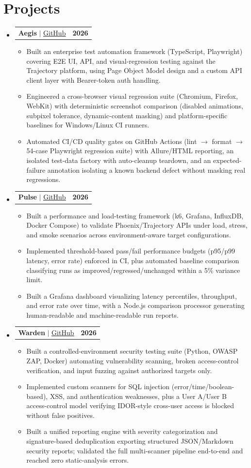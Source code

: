 \documentclass[letterpaper,10pt]{article}
\makeatletter
\newcommand{\resumeItem}[1]{
  \item\small{
    {#1 \vspace{-2pt}}
  }
}
\newcommand{\resumeProjectHeading}[2]{
    \item
    \begin{tabular*}{1.001\textwidth}{l@{\extracolsep{\fill}}r}
      \small#1 & \textbf{\small #2}\\
    \end{tabular*}\vspace{-7pt}
}
\newcommand{\resumeSubHeadingListStart}{\begin{itemize}[leftmargin=0.0in, label={}]}
\newcommand{\resumeSubHeadingListEnd}{\end{itemize}}
\newcommand{\resumeItemListStart}{\begin{itemize}}
\newcommand{\resumeItemListEnd}{\end{itemize}\vspace{-5pt}}
\makeatother
\begin{document}
\section{Projects}
    \vspace{-5pt}
    \resumeSubHeadingListStart
\resumeProjectHeading
    {\textbf{Aegis} $|$ \href{https://github.com/vaibhv19/Aegis}{\underline{GitHub}}}{2026}
    \resumeItemListStart
        \resumeItem{Built an enterprise test automation framework (TypeScript, Playwright) covering E2E UI, API, and visual-regression testing against the Trajectory platform, using Page Object Model design and a custom API client layer with Bearer-token auth handling.}
        \resumeItem{Engineered a cross-browser visual regression suite (Chromium, Firefox, WebKit) with deterministic screenshot comparison (disabled animations, subpixel tolerance, dynamic-content masking) and platform-specific baselines for Windows/Linux CI runners.}
        \resumeItem{Automated CI/CD quality gates on GitHub Actions (lint $\rightarrow$ format $\rightarrow$ 54-case Playwright regression suite) with Allure/HTML reporting, an isolated test-data factory with auto-cleanup teardown, and an expected-failure annotation isolating a known backend defect without masking real regressions.}
    \resumeItemListEnd
          \vspace{-13pt}
\resumeProjectHeading
    {\textbf{Pulse} $|$ \href{https://github.com/vaibhv19/Pulse}{\underline{GitHub}}}{2026}
    \resumeItemListStart
        \resumeItem{Built a performance and load-testing framework (k6, Grafana, InfluxDB, Docker Compose) to validate Phoenix/Trajectory APIs under load, stress, and smoke scenarios across environment-aware target configurations.}
        \resumeItem{Implemented threshold-based pass/fail performance budgets (p95/p99 latency, error rate) enforced in CI, plus automated baseline comparison classifying runs as improved/regressed/unchanged within a 5\% variance limit.}
        \resumeItem{Built a Grafana dashboard visualizing latency percentiles, throughput, and error rate over time, with a Node.js comparison processor generating human-readable and machine-readable run reports.}
    \resumeItemListEnd
          \vspace{-13pt}
\resumeProjectHeading
    {\textbf{Warden} $|$ \href{https://github.com/vaibhv19/Warden}{\underline{GitHub}}}{2026}
    \resumeItemListStart
        \resumeItem{Built a controlled-environment security testing suite (Python, OWASP ZAP, Docker) automating vulnerability scanning, broken access-control verification, and input fuzzing against authorized targets only.}
        \resumeItem{Implemented custom scanners for SQL injection (error/time/boolean-based), XSS, and authentication weaknesses, plus a User A/User B access-control model verifying IDOR-style cross-user access is blocked without false positives.}
        \resumeItem{Built a unified reporting engine with severity categorization and signature-based deduplication exporting structured JSON/Markdown security reports; validated the full multi-scanner pipeline end-to-end and reached zero static-analysis errors.}
    \resumeItemListEnd
    \resumeSubHeadingListEnd
\vspace{-12pt}
\end{document}
